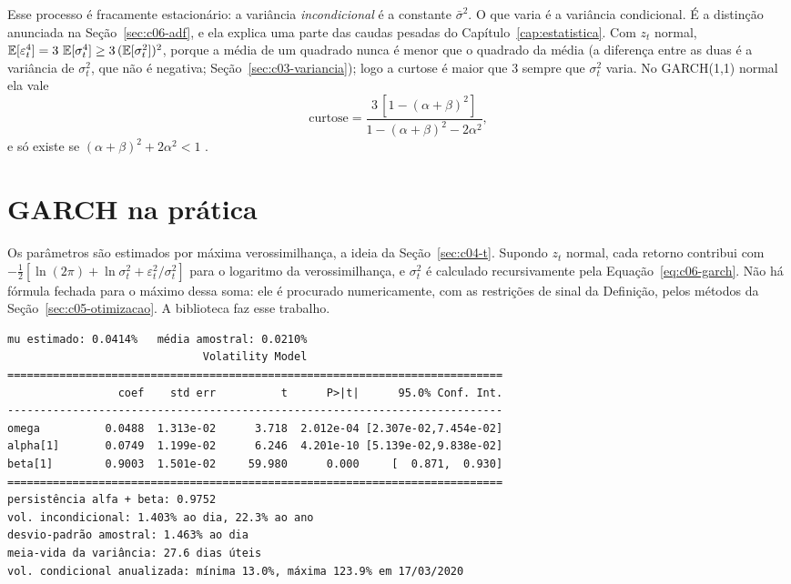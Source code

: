 Esse processo é fracamente estacionário: a variância \emph{incondicional} é a constante $\bar\sigma^2$. O que varia é a variância condicional. É a distinção anunciada na Seção~\ref{sec:c06-adf}, e ela explica uma parte das caudas pesadas do Capítulo~\ref{cap:estatistica}. Com $z_t$ normal, $\operatorname{\mathbb{E}}[\varepsilon_t^4] = 3\,\operatorname{\mathbb{E}}[\sigma_t^4] \ge 3\,(\operatorname{\mathbb{E}}[\sigma_t^2])^2$, porque a média de um quadrado nunca é menor que o quadrado da média (a diferença entre as duas é a variância de $\sigma_t^2$, que não é negativa; Seção~\ref{sec:c03-variancia}); logo a curtose é maior que 3 sempre que $\sigma_t^2$ varia. No GARCH(1,1) normal ela vale
\begin{equation}
  \text{curtose} = \frac{3\,[1-(\alpha+\beta)^2]}{1-(\alpha+\beta)^2-2\alpha^2} ,
  \label{eq:c06-curtose}
\end{equation}
e só existe se $(\alpha+\beta)^2 + 2\alpha^2 < 1$ \citep{tsay2010}.

\section{GARCH na prática}
\label{sec:c06-pratica}

Os parâmetros são estimados por máxima verossimilhança, a ideia da Seção~\ref{sec:c04-t}. Supondo $z_t$ normal, cada retorno contribui com $-\tfrac12\left[\ln(2\pi) + \ln\sigma_t^2 + \varepsilon_t^2/\sigma_t^2\right]$ para o logaritmo da verossimilhança, e $\sigma_t^2$ é calculado recursivamente pela Equação~\eqref{eq:c06-garch}. Não há fórmula fechada para o máximo dessa soma: ele é procurado numericamente, com as restrições de sinal da Definição, pelos métodos da Seção~\ref{sec:c05-otimizacao}. A biblioteca  faz esse trabalho.

\Needspace{32mm}

\Needspace{50mm}
\begin{largo}
\begin{lstlisting}[style=saida]
mu estimado: 0.0414%   média amostral: 0.0210%
                              Volatility Model
============================================================================
                 coef    std err          t      P>|t|      95.0% Conf. Int.
----------------------------------------------------------------------------
omega          0.0488  1.313e-02      3.718  2.012e-04 [2.307e-02,7.454e-02]
alpha[1]       0.0749  1.199e-02      6.246  4.201e-10 [5.139e-02,9.838e-02]
beta[1]        0.9003  1.501e-02     59.980      0.000     [  0.871,  0.930]
============================================================================
persistência alfa + beta: 0.9752
vol. incondicional: 1.403% ao dia, 22.3% ao ano
desvio-padrão amostral: 1.463% ao dia
meia-vida da variância: 27.6 dias úteis
vol. condicional anualizada: mínima 13.0%, máxima 123.9% em 17/03/2020
\end{lstlisting}
\end{largo}

